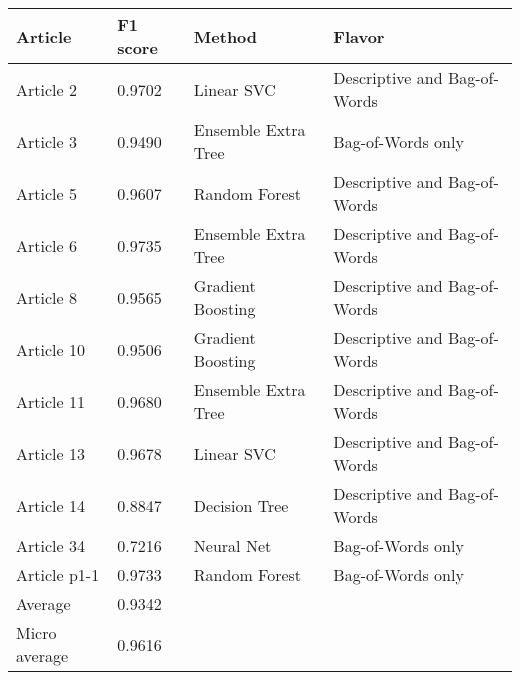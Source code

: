 \begin{tabular}{|l|l|l|l| }
\hline
Article & F1 score & Method & Flavor \\ \hline
Article 2 & 0.9702 & Linear SVC & Descriptive and Bag-of-Words\\
Article 3 & 0.9490 & Ensemble Extra Tree & Bag-of-Words only\\
Article 5 & 0.9607 & Random Forest & Descriptive and Bag-of-Words\\
Article 6 & 0.9735 & Ensemble Extra Tree & Descriptive and Bag-of-Words\\
Article 8 & 0.9565 & Gradient Boosting & Descriptive and Bag-of-Words\\
Article 10 & 0.9506 & Gradient Boosting & Descriptive and Bag-of-Words\\
Article 11 & 0.9680 & Ensemble Extra Tree & Descriptive and Bag-of-Words\\
Article 13 & 0.9678 & Linear SVC & Descriptive and Bag-of-Words\\
Article 14 & 0.8847 & Decision Tree & Descriptive and Bag-of-Words\\
Article 34 & 0.7216 & Neural Net & Bag-of-Words only\\
Article p1-1 & 0.9733 & Random Forest & Bag-of-Words only\\
Average & 0.9342 & & \\
Micro average & 0.9616 & & \\
\hline
\end{tabular}